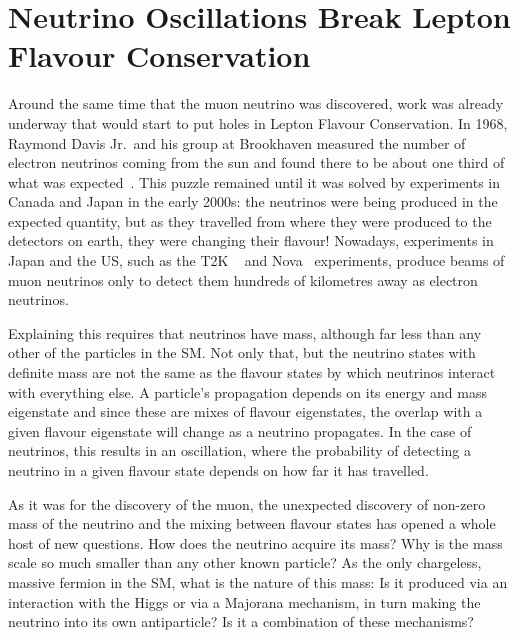 \section{Neutrino Oscillations Break Lepton Flavour Conservation}
Around the same time that the muon neutrino was discovered, work was already underway that would start to put holes in Lepton Flavour Conservation.
In 1968, Raymond Davis Jr.\ and his group at Brookhaven measured the number of electron neutrinos coming from the sun and found there to be about one third of what was expected~\cite{Davis:1968cp}.
This puzzle remained until it was solved by experiments in Canada and Japan in the early 2000s: the neutrinos were being produced in the expected quantity, but as they travelled from where they were produced to the detectors on earth, they were changing their flavour!
Nowadays, experiments in Japan and the US, such as the T2K ~\cite{T2K:nim} and Nova~\cite{NovaTDR} experiments, produce beams of muon neutrinos only to detect them hundreds of kilometres away as electron neutrinos.

Explaining this requires that neutrinos have mass, although far less than any other of the particles in the \ac{SM}.
Not only that, but the neutrino states with definite mass are not the same as the flavour states by which neutrinos interact with everything else.
A particle's propagation depends on its energy and mass eigenstate and since these are mixes of flavour eigenstates, the overlap with a given flavour eigenstate will change as a neutrino propagates.
In the case of neutrinos, this results in an oscillation, where the probability of detecting a neutrino in a given flavour state depends on how far it has travelled.
\FigTheoryMuEGammViaNeutrino

As it was for the discovery of the muon, the unexpected discovery  of non-zero mass of the neutrino and the mixing between flavour states has opened a whole host of new questions.
How does the neutrino acquire its mass?
  Why is the mass scale so much smaller than any other known particle?
As the only chargeless, massive fermion in the \ac{SM}, what is the nature of this mass:
Is it produced via an interaction with the Higgs or via a Majorana mechanism, in turn making the neutrino into its own antiparticle?
Is it a combination of these mechanisms?

